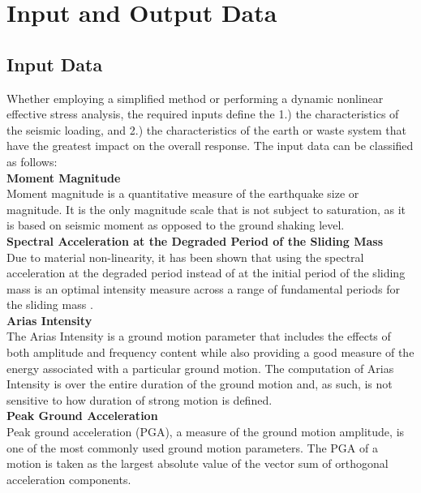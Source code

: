 \section{Input and Output Data}
\label{sec:eq_landslide_input_output}

\subsection{Input Data}
\label{subsec:eq_landslide_input}
Whether employing a simplified method or performing a dynamic nonlinear effective stress analysis, the required inputs define the 1.) the characteristics of the seismic loading, and 2.) the characteristics of the earth or waste system that have the greatest impact on the overall response. The input data can be classified as follows:\\[0.5em]

\noindent\textbf{Moment Magnitude}\\
Moment magnitude is a quantitative measure of the earthquake size or magnitude. It is the only magnitude scale that is
not subject to saturation, as it is based on seismic moment as opposed to the ground shaking level.\\

\noindent\textbf{Spectral Acceleration at the Degraded Period of the Sliding Mass}\\
Due to material non-linearity, it has been shown that using the spectral acceleration at the degraded period instead of at the initial period of the sliding mass is an optimal intensity measure across a range of fundamental periods for the sliding mass \citep{bray2007simplified}.\\

\noindent\textbf{Arias Intensity}\\
The Arias Intensity is a ground motion parameter that includes the effects of both amplitude and frequency content while also providing a good measure of the energy associated with a particular ground motion. The computation of Arias Intensity is over the entire duration of the ground motion and, as such, is not sensitive to how duration of strong motion is defined.\\

\noindent\textbf{Peak Ground Acceleration}\\
Peak ground acceleration (PGA), a measure of the ground motion amplitude, is one of the most commonly used ground motion parameters. The PGA of a motion is taken as the largest absolute value of the vector sum of orthogonal acceleration components.\\


